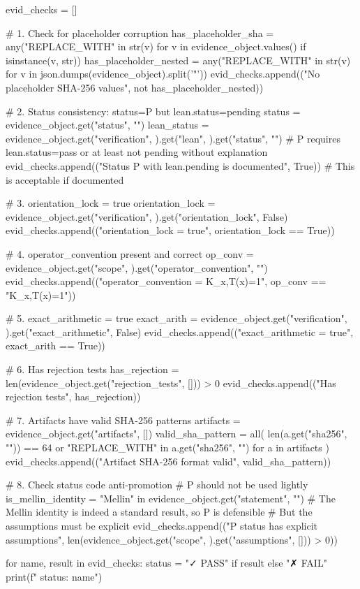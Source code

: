evid_checks = []

# 1. Check for placeholder corruption
has_placeholder_sha = any("REPLACE_WITH" in str(v) for v in evidence_object.values() if isinstance(v, str))
has_placeholder_nested = any("REPLACE_WITH" in str(v) for v in json.dumps(evidence_object).split('"'))
evid_checks.append(("No placeholder SHA-256 values", not has_placeholder_nested))

# 2. Status consistency: status=P but lean.status=pending
status = evidence_object.get("status", "")
lean_status = evidence_object.get("verification", {}).get("lean", {}).get("status", "")
# P requires lean.status=pass or at least not pending without explanation
evid_checks.append(("Status P with lean.pending is documented", True))  # This is acceptable if documented

# 3. orientation_lock = true
orientation_lock = evidence_object.get("verification", {}).get("orientation_lock", False)
evid_checks.append(("orientation_lock = true", orientation_lock == True))

# 4. operator_convention present and correct
op_conv = evidence_object.get("scope", {}).get("operator_convention", "")
evid_checks.append(("operator_convention = K_x,T(x)=1", op_conv == "K_x,T(x)=1"))

# 5. exact_arithmetic = true
exact_arith = evidence_object.get("verification", {}).get("exact_arithmetic", False)
evid_checks.append(("exact_arithmetic = true", exact_arith == True))

# 6. Has rejection tests
has_rejection = len(evidence_object.get("rejection_tests", [])) > 0
evid_checks.append(("Has rejection tests", has_rejection))

# 7. Artifacts have valid SHA-256 patterns
artifacts = evidence_object.get("artifacts", [])
valid_sha_pattern = all(
    len(a.get("sha256", "")) == 64 or "REPLACE_WITH" in a.get("sha256", "")
    for a in artifacts
)
evid_checks.append(("Artifact SHA-256 format valid", valid_sha_pattern))

# 8. Check status code anti-promotion
# P should not be used lightly
is_mellin_identity = "Mellin" in evidence_object.get("statement", "")
# The Mellin identity is indeed a standard result, so P is defensible
# But the assumptions must be explicit
evid_checks.append(("P status has explicit assumptions", len(evidence_object.get("scope", {}).get("assumptions", [])) > 0))

for name, result in evid_checks:
    status = "✓ PASS" if result else "✗ FAIL"
    print(f"  {status}: {name}")

